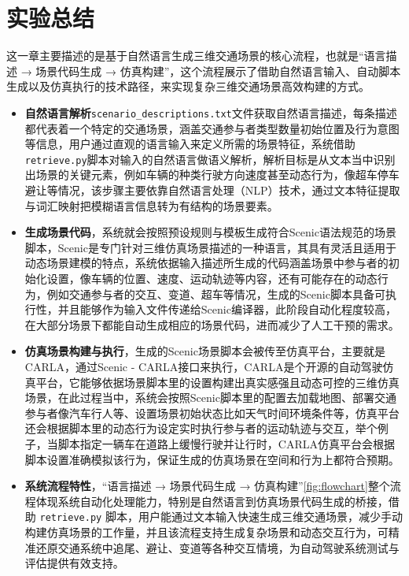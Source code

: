 \section{实验总结}

这一章主要描述的是基于自然语言生成三维交通场景的核心流程，也就是“语言描述 → 场景代码生成 → 仿真构建”，这个流程展示了借助自然语言输入、自动脚本生成以及仿真执行的技术路径，来实现复杂三维交通场景高效构建的方式。

\begin{itemize}
	\item \textbf{自然语言解析}\texttt{scenario\_descriptions.txt}文件获取自然语言描述，每条描述都代表着一个特定的交通场景，涵盖交通参与者类型数量初始位置及行为意图等信息，用户通过直观的语言输入来定义所需的场景特征，系统借助\texttt{retrieve.py}脚本对输入的自然语言做语义解析，解析目标是从文本当中识别出场景的关键元素，例如车辆的种类行驶方向速度甚至动态行为，像超车停车避让等情况，该步骤主要依靠自然语言处理（NLP）技术，通过文本特征提取与词汇映射把模糊语言信息转为有结构的场景要素。
	
	\item \textbf{生成场景代码}，系统就会按照预设规则与模板生成符合Scenic语法规范的场景脚本，Scenic是专门针对三维仿真场景描述的一种语言，其具有灵活且适用于动态场景建模的特点，系统依据输入描述所生成的代码涵盖场景中参与者的初始化设置，像车辆的位置、速度、运动轨迹等内容，还有可能存在的动态行为，例如交通参与者的交互、变道、超车等情况，生成的Scenic脚本具备可执行性，并且能够作为输入文件传递给Scenic编译器，此阶段自动化程度较高，在大部分场景下都能自动生成相应的场景代码，进而减少了人工干预的需求。
	
	\item \textbf{仿真场景构建与执行}，生成的Scenic场景脚本会被传至仿真平台，主要就是CARLA，通过Scenic - CARLA接口来执行，CARLA是个开源的自动驾驶仿真平台，它能够依据场景脚本里的设置构建出真实感强且动态可控的三维仿真场景，在此过程当中，系统会按照Scenic脚本里的配置去加载地图、部署交通参与者像汽车行人等、设置场景初始状态比如天气时间环境条件等，仿真平台还会根据脚本里的动态行为设定实时执行参与者的运动轨迹与交互，举个例子，当脚本指定一辆车在道路上缓慢行驶并让行时，CARLA仿真平台会根据脚本设置准确模拟该行为，保证生成的仿真场景在空间和行为上都符合预期。
	
	\item \textbf{系统流程特性}，“语言描述 → 场景代码生成 → 仿真构建”\ref{fig:flowchart}整个流程体现系统自动化处理能力，特别是自然语言到仿真场景代码生成的桥接，借助 \texttt{retrieve.py} 脚本，用户能通过文本输入快速生成三维交通场景，减少手动构建仿真场景的工作量，并且该流程支持生成复杂场景和动态交互行为，可精准还原交通系统中追尾、避让、变道等各种交互情境，为自动驾驶系统测试与评估提供有效支持。
	
\end{itemize}
